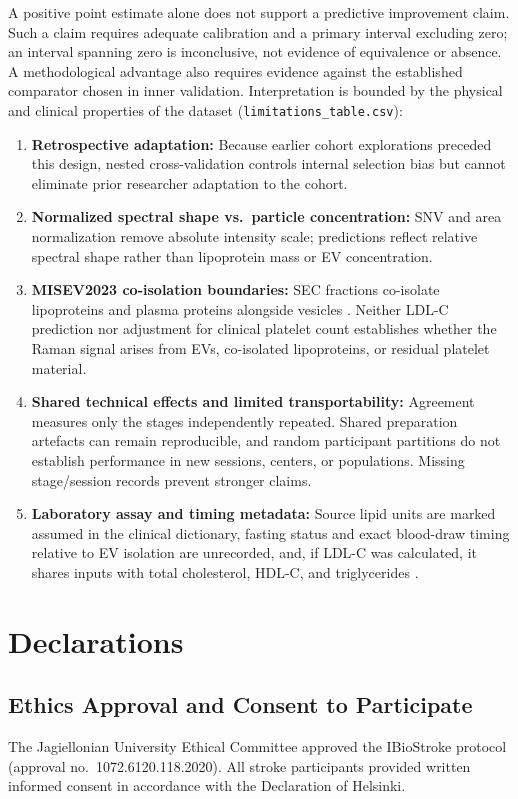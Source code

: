 \documentclass[preprint,12pt]{elsarticle}
\begin{document}
A positive point estimate alone does not support a predictive improvement claim. Such a claim requires adequate calibration and a primary interval excluding zero; an interval spanning zero is inconclusive, not evidence of equivalence or absence. A methodological advantage also requires evidence against the established comparator chosen in inner validation. Interpretation is bounded by the physical and clinical properties of the dataset (\texttt{limitations\_table.csv}):
\begin{enumerate}
    \item \textbf{Retrospective adaptation:} Because earlier cohort explorations preceded this design, nested cross-validation controls internal selection bias but cannot eliminate prior researcher adaptation to the cohort.
    \item \textbf{Normalized spectral shape vs.\ particle concentration:} SNV and area normalization remove absolute intensity scale; predictions reflect relative spectral shape rather than lipoprotein mass or EV concentration.
    \item \textbf{MISEV2023 co-isolation boundaries:} SEC fractions co-isolate lipoproteins and plasma proteins alongside vesicles \cite{welsh2024, bracht2024}. Neither LDL-C prediction nor adjustment for clinical platelet count establishes whether the Raman signal arises from EVs, co-isolated lipoproteins, or residual platelet material.
    \item \textbf{Shared technical effects and limited transportability:} Agreement measures only the stages independently repeated. Shared preparation artefacts can remain reproducible, and random participant partitions do not establish performance in new sessions, centers, or populations. Missing stage/session records prevent stronger claims.
    \item \textbf{Laboratory assay and timing metadata:} Source lipid units are marked assumed in the clinical dictionary, fasting status and exact blood-draw timing relative to EV isolation are unrecorded, and, if LDL-C was calculated, it shares inputs with total cholesterol, HDL-C, and triglycerides \cite{friedewald1972}.
\end{enumerate}

\section*{Declarations}

\subsection*{Ethics Approval and Consent to Participate}
The Jagiellonian University Ethical Committee approved the IBioStroke protocol (approval no.\ 1072.6120.118.2020). All stroke participants provided written informed consent in accordance with the Declaration of Helsinki.
\end{document}
